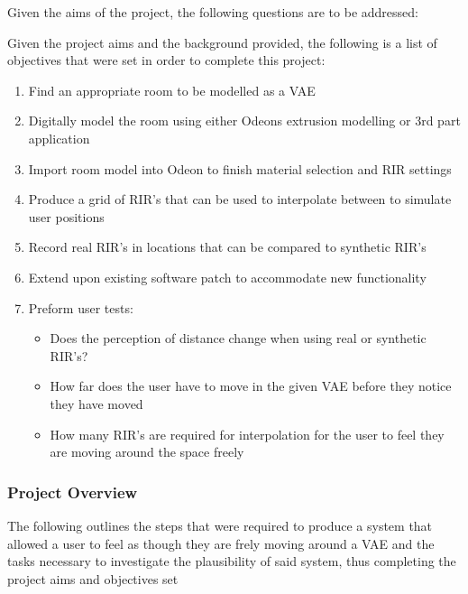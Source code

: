 \documentclass[../../main.tex]{subfiles}
\begin{document}
			Given the aims of the project, the following questions are to be addressed:

			Given the project aims and the background provided, the following is a list of objectives that were set in order to complete this project:

			\begin{enumerate}
				\item Find an appropriate room to be modelled as a \ac{VAE} \\
				\item Digitally model the room using either Odeons extrusion modelling or 3rd part application \\
				\item Import room model into Odeon to finish material selection and \ac{RIR} settings\\
				\item Produce a grid of \ac{RIR}'s that can be used to interpolate between to simulate user positions\\
				\item Record real \ac{RIR}'s in locations that can be compared to synthetic \ac{RIR}'s\\
				\item Extend upon existing software patch to accommodate new functionality\\
				\item  Preform user tests:
					\begin{itemize}
						\item Does the perception of distance change when using real or synthetic \ac{RIR}'s?\\
						\item How far does the user have to move in the given \ac{VAE} before they notice they have moved \\
						\item How many \ac{RIR}'s are required for interpolation for the user to feel they are moving around the space freely\\
					\end{itemize}
				\end{enumerate}


		\subsubsection{Project Overview}

			The following outlines the steps that were required to produce a system that allowed a user to feel as though they are frely moving around a \ac{VAE} and the tasks necessary to investigate the plausibility of said system, thus completing the project aims and objectives set
\end{document}
